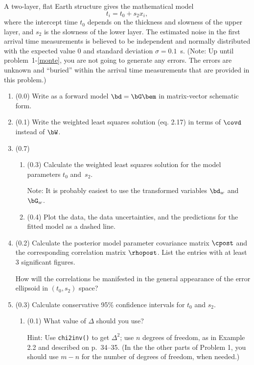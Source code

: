 \documentclass[11pt,titlepage,fleqn]{article}
\begin{document}
A two-layer, flat Earth structure gives the mathematical model
%
\begin{equation}
t_i = t_0 + s_2x_i,
\label{twolayer}
\end{equation}
%
where the intercept time $t_0$ depends on the thickness and slowness of the upper layer, and $s_2$ is the slowness of the lower layer. The estimated noise in the first arrival time measurements is believed to be independent and normally distributed with the expected value 0 and standard deviation $\sigma = 0.1$~s. (Note: Up until problem~1-\ref{monte}, you are not going to generate any errors. The errors are unknown and ``buried'' within the arrival time measurements that are provided in this problem.)
%
\begin{enumerate}
\item (0.0) Write  as a forward model $\bd = \bG\bem$ in matrix-vector schematic form.

\item (0.1) Write the weighted least squares solution (eq. 2.17) in terms of $\covd$ instead of $\bW$.

\item (0.7) 
\begin{enumerate}
\item (0.3) Calculate the weighted least squares solution for the model parameters $t_0$ and~$s_2$.

Note: It is probably easiest to use the transformed variables $\bd_w$ and $\bG_w$.
\item (0.4) Plot the data, the data uncertainties, and the predictions for the fitted model as a dashed line.
\end{enumerate}


\item (0.2) Calculate the posterior model parameter covariance matrix $\cpost$ and the corresponding correlation matrix $\rhopost$. List the entries with at least 3 significant figures.

How will the correlations be manifested in the general appearance of the error ellipsoid in $(t_0,s_2)$ space?

\pagebreak
\item (0.3) Calculate conservative 95\% confidence intervals for $t_0$ and $s_2$.
%
\begin{enumerate}
\item (0.1) What value of $\Delta$ should you use?

Hint: Use \verb+chi2inv()+ to get $\Delta^2$; use $n$ degrees of freedom, as in Example 2.2 and described on p.~34--35. (In the the other parts of Problem 1, you should use $m-n$ for the number of degrees of freedom, when needed.)


\end{enumerate}
\end{enumerate}
\end{document}
